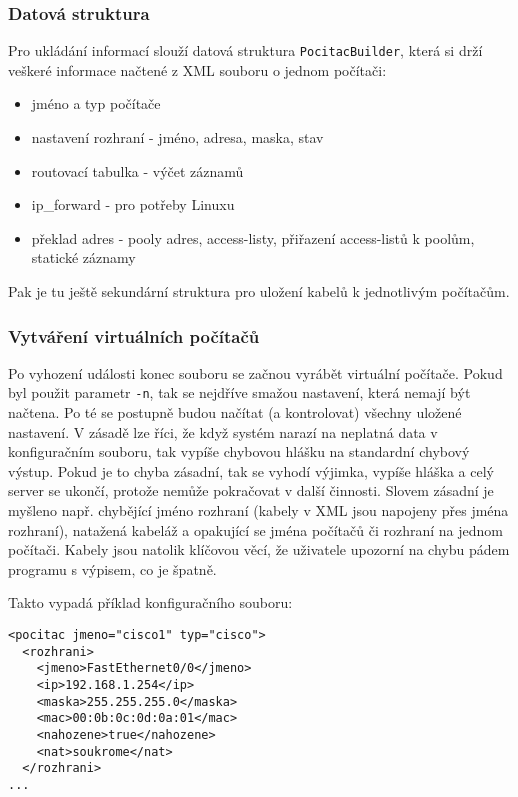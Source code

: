 \subsubsection{Datová struktura}
Pro ukládání informací slouží datová struktura \verb|PocitacBuilder|, která si drží veškeré informace načtené z XML souboru o jednom počítači:
\begin{itemize}
 \item jméno a typ počítače
 \item nastavení rozhraní - jméno, adresa, maska, stav
 \item routovací tabulka - výčet záznamů
 \item ip\_forward - pro potřeby Linuxu
 \item překlad adres - pooly adres, access-listy, přiřazení access-listů k poolům, statické záznamy
\end{itemize}

Pak je tu ještě sekundární struktura pro uložení kabelů k jednotlivým počítačům.

\subsubsection{Vytváření virtuálních počítačů}
Po vyhození události konec souboru se začnou vyrábět virtuální počítače. Pokud byl použit parametr \verb|-n|, tak se nejdříve smažou nastavení, která nemají být načtena. Po té se postupně budou načítat (a kontrolovat) všechny uložené nastavení. V zásadě lze říci, že když systém narazí na neplatná data v konfiguračním souboru, tak vypíše chybovou hlášku na standardní chybový výstup. Pokud je to chyba zásadní, tak se vyhodí výjimka, vypíše hláška a celý server se ukončí, protože nemůže pokračovat v další činnosti. Slovem zásadní je myšleno např. chybějící jméno rozhraní (kabely v XML jsou napojeny přes jména rozhraní), natažená kabeláž a opakující se jména počítačů či rozhraní na jednom počítači. Kabely jsou natolik klíčovou věcí, že uživatele upozorní na chybu pádem programu s výpisem, co je špatně. 

Takto vypadá příklad konfiguračního souboru:
\begin{verbatim}
<pocitac jmeno="cisco1" typ="cisco">
  <rozhrani>
    <jmeno>FastEthernet0/0</jmeno>
    <ip>192.168.1.254</ip>
    <maska>255.255.255.0</maska>
    <mac>00:0b:0c:0d:0a:01</mac>
    <nahozene>true</nahozene>
    <nat>soukrome</nat>
  </rozhrani>
...
\end{verbatim} 


